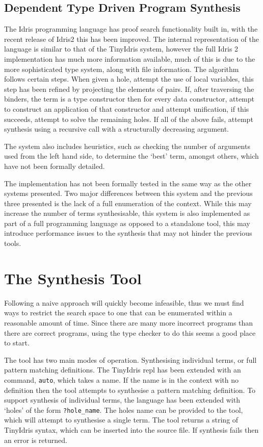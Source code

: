 \documentclass[a4paper]{article}
\begin{document}
\subsection{Dependent Type Driven Program Synthesis}
\label{sec:org0ffcb16}
The Idris programming language has proof search functionality built in, with the recent release of Idris2 this has 
been improved. The internal representation of the language is similar to that of the TinyIdris system, 
however the full Idris 2 implementation has much more information available, much of this is due to the more sophisticated 
type system, along with file information. The algorithm follows certain steps. 
When given a hole, attempt the use of local variables, this step has been refined by projecting the elements of pairs.
If, after traversing the binders, the term is a type constructor then for every data
constructor, attempt to construct an application of that constructor and attempt unification, if this succeeds, attempt
to solve the remaining holes. If all of the above fails, attempt synthesis using a recursive call with a structurally 
decreasing argument. 

The system also includes heuristics, such as checking the number of arguments used from the left hand side, to determine
the `best' term, amongst others, which have not been formally detailed.

The implementation has not been formally tested in the same way as the other systems presented. Two major differences 
between this system and the previous three presented is the lack of a full enumeration of the context. While this may 
increase the number of terms synthesisable, this system is also implemented as part of a full programming language as 
opposed to a standalone tool, this may introduce performance issues to the synthesis that may not hinder the previous 
tools. 

\section{The Synthesis Tool}
\label{sec:org2ddd7e5}
Following a naive approach will quickly become infeasible, 
thus we must find ways to restrict the search space to one that can be enumerated within a reasonable amount of time. Since there are 
many more incorrect programs than there are correct programs, using the type checker to do this seems a good place 
to start. 

The tool has two main modes of operation. Synthesising individual terms, or full pattern matching 
definitions. The TinyIdris repl has been extended with an command, \texttt{auto}, which takes a name.
If the name is in the context with no definition then the tool attempts to synthesise a pattern matching definition. 
To support synthesis of individual terms, the language has been extended with `holes' of the form \texttt{?hole\_name}.
The holes name can be provided to the tool, which will attempt to synthesise a single term.
The tool returns a string of TinyIdris syntax, which can be
inserted into the source file. If synthesis fails then an error is returned. 
\end{document}
